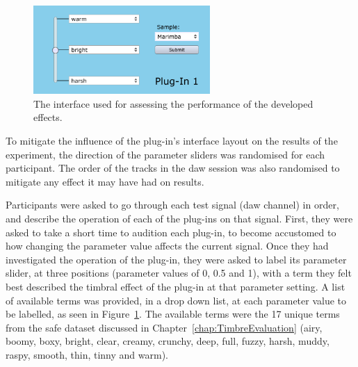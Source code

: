 			\begin{figure}[h!]
				\centering
				\includegraphics[width=0.6\textwidth]{chapter7/Images/TestPlugInInterface.png}
				\caption{The interface used for assessing the performance of the developed effects.}
				\label{fig:TestPlugInterface}
			\end{figure}

			To mitigate the influence of the plug-in's interface layout on the results of the experiment, the
			direction of the parameter sliders was randomised for each participant. The order of the tracks in
			the \acrshort{daw} session was also randomised to mitigate any effect it may have had on results.

			Participants were asked to go through each test signal (\acrshort{daw} channel) in order, and
			describe the operation of each of the plug-ins on that signal. First, they were asked to take a
			short time to audition each plug-in, to become accustomed to how changing the parameter value
			affects the current signal. Once they had investigated the operation of the plug-in, they were
			asked to label its parameter slider, at three positions (parameter values of 0, 0.5 and 1), with a
			term they felt best described the timbral effect of the plug-in at that parameter setting. A list
			of available terms was provided, in a drop down list, at each parameter value to be labelled, as
			seen in Figure~\ref{fig:TestPlugInterface}. The available terms were the 17 unique terms from the
			\acrshort{safe} dataset discussed in Chapter~\ref{chap:TimbreEvaluation} (airy, boomy, boxy,
			bright, clear, creamy, crunchy, deep, full, fuzzy, harsh, muddy, raspy, smooth, thin, tinny and
			warm).

